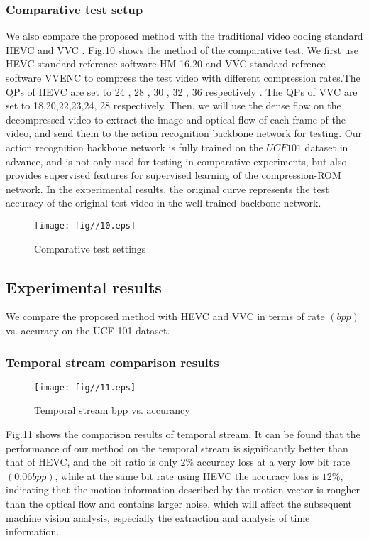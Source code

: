 \documentclass[a4paper]{cas-sc}
\begin{document}
\subsubsection{Comparative test setup}
We also compare the proposed method with the traditional video coding standard HEVC and VVC . 
Fig.10 shows the method of the comparative test. 
We first use HEVC standard reference software HM-16.20 and VVC standard refrence software VVENC to 
compress the test video with different compression rates.The QPs of HEVC are set to 24 , 28 , 30 , 32 , 36 respectively . 
The QPs of VVC are set to 18,20,22,23,24, 28 respectively.  
Then, we will use the dense flow on the decompressed video to extract the image and optical flow of each frame of the video, 
and send them to the action recognition backbone network for testing. 
Our action recognition backbone network is fully trained on the $UCF101$ dataset in advance, 
and is not only used for testing in comparative experiments, 
but also provides supervised features for supervised learning of the compression-ROM network. 
In the experimental results, the original curve represents the test accuracy of the original test video in the well trained backbone 
network.\\

\begin{figure}[ht]
	\centering
		\texttt{[image: fig//10.eps]}
	  \caption{Comparative test settings}\label{fig.10}
\end{figure}

\subsection{Experimental results}
We compare the proposed method with HEVC and VVC in terms of rate $(bpp)$ vs. accuracy on the UCF 101 dataset.\\

\subsubsection{ Temporal stream comparison results}

\begin{figure}[ht]
	\centering
		\texttt{[image: fig//11.eps]}
	  \caption{Temporal stream bpp vs. accurancy}\label{fig.11}
\end{figure}

Fig.11 shows the comparison results of temporal stream. 
It can be found that the performance of our method on the temporal stream is significantly better than that of HEVC, 
and the bit ratio is only $2\%$ accuracy loss at a very low bit rate $( 0.06 bpp)$, 
while at the same bit rate using HEVC the accuracy loss is $12\%$, 
indicating that the motion information described by the motion vector is rougher than the optical flow and contains larger noise, 
which will affect the subsequent machine vision analysis, especially the extraction and analysis of time information.\\
\end{document}

